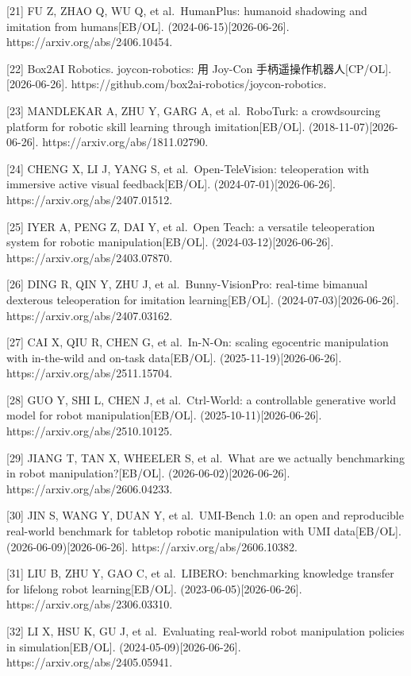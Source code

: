 \documentclass[
  chinese,
]{ctexart}
\begin{document}
{[}21{]} FU Z, ZHAO Q, WU Q, et al.~HumanPlus: humanoid shadowing and
imitation from humans{[}EB/OL{]}. (2024-06-15){[}2026-06-26{]}.
https://arxiv.org/abs/2406.10454.

{[}22{]} Box2AI Robotics. joycon-robotics: 用 Joy-Con
手柄遥操作机器人{[}CP/OL{]}. {[}2026-06-26{]}.
https://github.com/box2ai-robotics/joycon-robotics.

{[}23{]} MANDLEKAR A, ZHU Y, GARG A, et al.~RoboTurk: a crowdsourcing
platform for robotic skill learning through imitation{[}EB/OL{]}.
(2018-11-07){[}2026-06-26{]}. https://arxiv.org/abs/1811.02790.

{[}24{]} CHENG X, LI J, YANG S, et al.~Open-TeleVision: teleoperation
with immersive active visual feedback{[}EB/OL{]}.
(2024-07-01){[}2026-06-26{]}. https://arxiv.org/abs/2407.01512.

{[}25{]} IYER A, PENG Z, DAI Y, et al.~Open Teach: a versatile
teleoperation system for robotic manipulation{[}EB/OL{]}.
(2024-03-12){[}2026-06-26{]}. https://arxiv.org/abs/2403.07870.

{[}26{]} DING R, QIN Y, ZHU J, et al.~Bunny-VisionPro: real-time
bimanual dexterous teleoperation for imitation learning{[}EB/OL{]}.
(2024-07-03){[}2026-06-26{]}. https://arxiv.org/abs/2407.03162.

{[}27{]} CAI X, QIU R, CHEN G, et al.~In-N-On: scaling egocentric
manipulation with in-the-wild and on-task data{[}EB/OL{]}.
(2025-11-19){[}2026-06-26{]}. https://arxiv.org/abs/2511.15704.

{[}28{]} GUO Y, SHI L, CHEN J, et al.~Ctrl-World: a controllable
generative world model for robot manipulation{[}EB/OL{]}.
(2025-10-11){[}2026-06-26{]}. https://arxiv.org/abs/2510.10125.

{[}29{]} JIANG T, TAN X, WHEELER S, et al.~What are we actually
benchmarking in robot manipulation?{[}EB/OL{]}.
(2026-06-02){[}2026-06-26{]}. https://arxiv.org/abs/2606.04233.

{[}30{]} JIN S, WANG Y, DUAN Y, et al.~UMI-Bench 1.0: an open and
reproducible real-world benchmark for tabletop robotic manipulation with
UMI data{[}EB/OL{]}. (2026-06-09){[}2026-06-26{]}.
https://arxiv.org/abs/2606.10382.

{[}31{]} LIU B, ZHU Y, GAO C, et al.~LIBERO: benchmarking knowledge
transfer for lifelong robot learning{[}EB/OL{]}.
(2023-06-05){[}2026-06-26{]}. https://arxiv.org/abs/2306.03310.

{[}32{]} LI X, HSU K, GU J, et al.~Evaluating real-world robot
manipulation policies in simulation{[}EB/OL{]}.
(2024-05-09){[}2026-06-26{]}. https://arxiv.org/abs/2405.05941.
\end{document}
